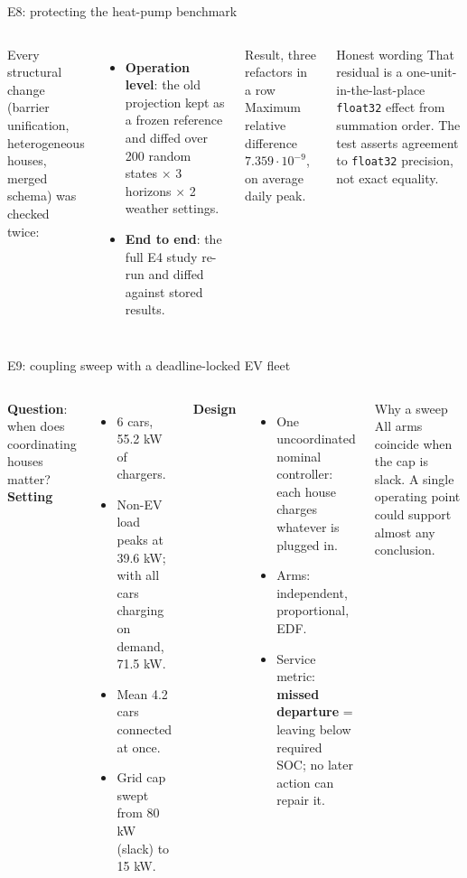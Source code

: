 \documentclass[aspectratio=169,10pt]{beamer}
\begin{document}
\begin{frame}{E8: protecting the heat-pump benchmark}
\begin{columns}[T]
Every structural change (barrier unification, heterogeneous houses, merged schema) was checked twice:
\begin{itemize}
  \item \textbf{Operation level}: the old projection kept as a frozen reference and diffed over 200 random states $\times$ 3 horizons $\times$ 2 weather settings.
  \item \textbf{End to end}: the full E4 study re-run and diffed against stored results.
\end{itemize}
\begin{exampleblock}{Result, three refactors in a row}
Maximum relative difference $7.359 \cdot 10^{-9}$, on average daily peak.
\end{exampleblock}
\begin{block}{Honest wording}
That residual is a one-unit-in-the-last-place \texttt{float32} effect from summation order. The test asserts agreement to \texttt{float32} precision, not exact equality.
\end{block}
\end{columns}
\end{frame}

\begin{frame}{E9: coupling sweep with a deadline-locked EV fleet}
\begin{columns}[T]
\textbf{Question}: when does coordinating houses matter?\\[4pt]
\textbf{Setting}
\begin{itemize}
  \item 6 cars, 55.2 kW of chargers.
  \item Non-EV load peaks at 39.6 kW; with all cars charging on demand, 71.5 kW.
  \item Mean 4.2 cars connected at once.
  \item Grid cap swept from 80 kW (slack) to 15 kW.
\end{itemize}
\textbf{Design}
\begin{itemize}
  \item One uncoordinated nominal controller: each house charges whatever is plugged in.
  \item Arms: independent, proportional, EDF.
  \item Service metric: \textbf{missed departure} = leaving below required SOC; no later action can repair it.
\end{itemize}
\begin{block}{Why a sweep}
All arms coincide when the cap is slack. A single operating point could support almost any conclusion.
\end{block}
\end{columns}
\end{frame}
\end{document}
